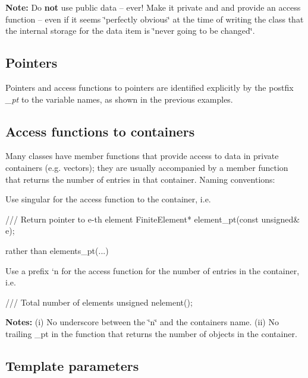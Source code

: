 {\bfseries Note\+:} Do {\bfseries not} use public data -- ever! Make it private and and provide an access function -- even if it seems \char`\"{}perfectly
 obvious\char`\"{} at the time of writing the class that the internal storage for the data item is \char`\"{}never going to be changed\char`\"{}.\hypertarget{index_pointers}{}\subsection{Pointers}\label{index_pointers}

\begin{DoxyItemize}
\item Pointers and access functions to pointers are identified explicitly by the postfix {\itshape \+\_\+pt} to the variable names, as shown in the previous examples.
\end{DoxyItemize}\hypertarget{index_numbering}{}\subsection{Access functions to containers}\label{index_numbering}
Many classes have member functions that provide access to data in private containers (e.\+g. vectors); they are usually accompanied by a member function that returns the number of entries in that container. Naming conventions\+:
\begin{DoxyItemize}
\item Use singular for the access function to the container, i.\+e. 
\begin{DoxyCode}
\textcolor{comment}{/// Return pointer to e-th element}
\textcolor{comment}{}FiniteElement* element\_pt(\textcolor{keyword}{const} \textcolor{keywordtype}{unsigned}& e);
\end{DoxyCode}
 rather than {\ttfamily elements\+\_\+pt}(...)
\item Use a prefix `{\ttfamily n\textquotesingle{}} for the access function for the number of entries in the container, i.\+e. 
\begin{DoxyCode}
\textcolor{comment}{/// Total number of elements }
\textcolor{comment}{}\textcolor{keywordtype}{unsigned} nelement();
\end{DoxyCode}
 {\bfseries Notes\+:} (i) No underscore between the \char`\"{}n\char`\"{} and the container\textquotesingle{}s name. (ii) No trailing {\ttfamily \+\_\+pt} in the function that returns the number of objects in the container.
\end{DoxyItemize}\hypertarget{index_template}{}\subsection{Template parameters}\label{index_template}

